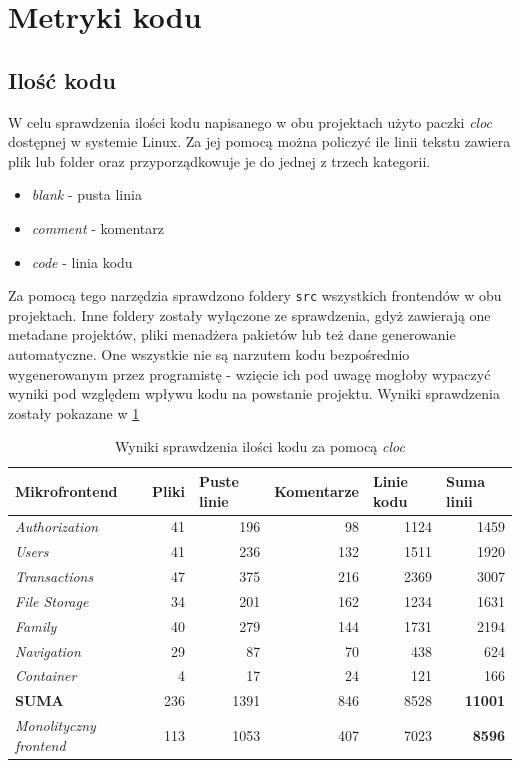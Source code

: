 \documentclass{SGGW-thesis}
\begin{document}
  \section{Metryki kodu}
    \subsection{Ilość kodu}
    W celu sprawdzenia ilości kodu napisanego w obu projektach użyto paczki \textit{cloc} dostępnej w systemie Linux. Za jej pomocą można policzyć ile linii tekstu zawiera plik lub folder oraz przyporządkowuje je do jednej z trzech kategorii.

    \begin{itemize}
      \item \textit{blank} - pusta linia
      \item \textit{comment} - komentarz
      \item \textit{code} - linia kodu
    \end{itemize}

    Za pomocą tego narzędzia sprawdzono foldery \lstinline{src} wszystkich frontendów w obu projektach. Inne foldery zostały wyłączone ze sprawdzenia, gdyż zawierają one metadane projektów, pliki menadżera pakietów lub też dane generowanie automatyczne. One wszystkie nie są narzutem kodu bezpośrednio wygenerowanym przez programistę - wzięcie ich pod uwagę mogłoby wypaczyć wyniki pod względem wpływu kodu na powstanie projektu. Wyniki sprawdzenia zostały pokazane w \cref{table:cloc}

    \begin{table}[h]
      \centering
      \caption{Wyniki sprawdzenia ilości kodu za pomocą \textit{cloc}}
      \begin{tabular}{|l||r|r|r|r|r|}
      \hline
      \textbf{Mikrofrontend} & \multicolumn{1}{l|}{\textbf{Pliki}} & \multicolumn{1}{l|}{\textbf{Puste linie}} & \multicolumn{1}{l|}{\textbf{Komentarze}} & \multicolumn{1}{l|}{\textbf{Linie kodu}} & \multicolumn{1}{l|}{\textbf{Suma linii}} \\ \hline
      \textit{Authorization} & 41 & 196 & 98 & 1124 & 1459 \\ \hline
      \textit{Users} & 41 & 236 & 132 & 1511 & 1920 \\ \hline
      \textit{Transactions} & 47 & 375 & 216 & 2369 & 3007 \\ \hline
      \textit{File Storage} & 34 & 201 & 162 & 1234 & 1631 \\ \hline
      \textit{Family} & 40 & 279 & 144 & 1731 & 2194 \\ \hline
      \textit{Navigation} & 29 & 87 & 70 & 438 & 624 \\ \hline
      \textit{Container} & 4 & 17 & 24 & 121 & 166 \\ \hline
      \textbf{SUMA}& 236 & 1391 & 846 & 8528 & \textbf{11001} \\ \hline\hline
      \textit{Monolityczny frontend} & 113 & 1053 & 407 & 7023 & \textbf{8596} \\ \hline
      \end{tabular}
      \label{table:cloc}
    \end{table}
\end{document}
